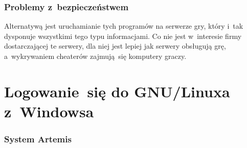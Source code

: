 \documentclass[10pt,t]{beamer}
\begin{document}
\begin{frame}
  \frametitle{Problemy z~bezpieczeństwem}


  Alternatywą jest uruchamianie tych programów na serwerze
  gry, który i~tak dysponuje wszystkimi tego typu informacjami. Co nie jest
  w~interesie firmy dostarczającej te serwery, dla niej jest lepiej jak
  serwery obsługują grę, a~wykrywaniem cheaterów zajmują~się komputery
  graczy.

\end{frame}










\section{Logowanie~się do GNU/Linuxa z~Windowsa}


\begin{frame}
  \frametitle{System Artemis}




\end{frame}
\end{document}
